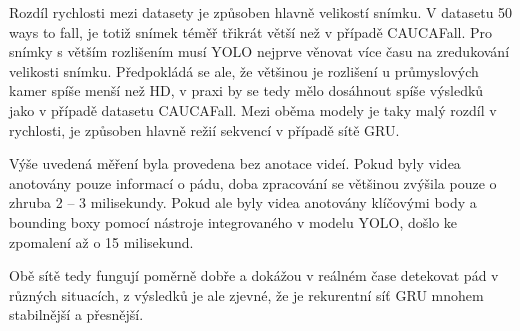 Rozdíl rychlosti mezi datasety je způsoben hlavně velikostí snímku. V datasetu
50 ways to fall, je totiž snímek téměř třikrát větší než v případě CAUCAFall.
Pro snímky s větším rozlišením musí YOLO nejprve věnovat více času na
zredukování velikosti snímku. Předpokládá se ale, že většinou je rozlišení u
průmyslových kamer spíše menší než HD, v praxi by se tedy mělo dosáhnout spíše
výsledků jako v případě datasetu CAUCAFall. Mezi oběma modely je taky malý rozdíl v
rychlosti, je způsoben hlavně režií sekvencí v případě sítě GRU.

Výše uvedená měření byla provedena bez anotace videí. Pokud byly videa anotovány pouze informací o pádu, doba zpracování se většinou zvýšila
pouze o zhruba 2 – 3 milisekundy. Pokud ale byly videa anotovány klíčovými body
a bounding boxy pomocí nástroje integrovaného v modelu YOLO, došlo ke zpomalení až o 15
milisekund.

Obě sítě tedy fungují poměrně dobře a dokážou v reálném čase detekovat pád v
různých situacích, z výsledků je ale zjevné, že je rekurentní síť GRU mnohem
stabilnější a přesnější.

